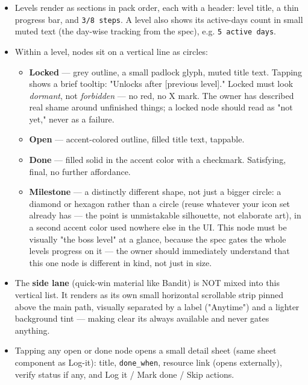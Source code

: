 \begin{itemize}
\tightlist
\item
  Levels render as sections in pack order, each with a header: level
  title, a thin progress bar, and \texttt{3/8 steps}. A level also
  shows its active-days count in small muted text (the day-wise tracking
  from the spec), e.g. \texttt{5 active days}.
\item
  Within a level, nodes sit on a vertical line as circles:

  \begin{itemize}
  \tightlist
  \item
    \textbf{Locked} --- grey outline, a small padlock glyph, muted title
    text. Tapping shows a brief tooltip: "Unlocks after {[}previous
    level{]}." Locked must look \emph{dormant}, not \emph{forbidden} ---
    no red, no X mark. The owner has described real shame around
    unfinished things; a locked node should read as "not yet," never as
    a failure.
  \item
    \textbf{Open} --- accent-colored outline, filled title text,
    tappable.
  \item
    \textbf{Done} --- filled solid in the accent color with a checkmark.
    Satisfying, final, no further affordance.
  \item
    \textbf{Milestone} --- a distinctly different shape, not just a
    bigger circle: a diamond or hexagon rather than a circle (reuse
    whatever your icon set already has --- the point is unmistakable
    silhouette, not elaborate art), in a second accent color used
    nowhere else in the UI. This node must be visually "the boss level"
    at a glance, because the spec gates the whole
    level\textquotesingle s progress on it --- the owner should
    immediately understand that this one node is different in kind, not
    just in size.
  \end{itemize}
\item
  The \textbf{side lane} (quick-win material like Bandit) is NOT mixed
  into this vertical list. It renders as its own small horizontal
  scrollable strip pinned above the main path, visually separated by a
  label ("Anytime") and a lighter background tint --- making clear
  it\textquotesingle s always available and never gates anything.
\item
  Tapping any open or done node opens a small detail sheet (same sheet
  component as Log-it): title, \texttt{done\_when}, resource link (opens
  externally), verify status if any, and Log it / Mark done / Skip
  actions.
\end{itemize}

